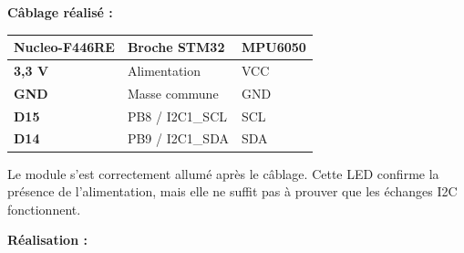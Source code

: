\documentclass[11pt,a4paper]{article}
\begin{document}
\begin{sessionbox}
		\vspace{0.3cm}
		
		\textbf{Câblage réalisé :}
		
		\begin{center}
			\begin{tabular}{>{\bfseries}p{4cm}p{4cm}p{4cm}}
				\toprule
				Nucleo-F446RE & Broche STM32 & MPU6050 \\
				\midrule
				3,3 V & Alimentation & VCC \\
				GND & Masse commune & GND \\
				D15 & PB8 / I2C1\_SCL & SCL \\
				D14 & PB9 / I2C1\_SDA & SDA \\
				\bottomrule
			\end{tabular}
		\end{center}
		
		Le module s'est correctement allumé après le câblage. Cette LED confirme la présence de l'alimentation, mais elle ne suffit pas à prouver que les échanges I2C fonctionnent.
		
		\vspace{0.3cm}
		
		\textbf{Réalisation :}
		

\end{sessionbox}
\end{document}
